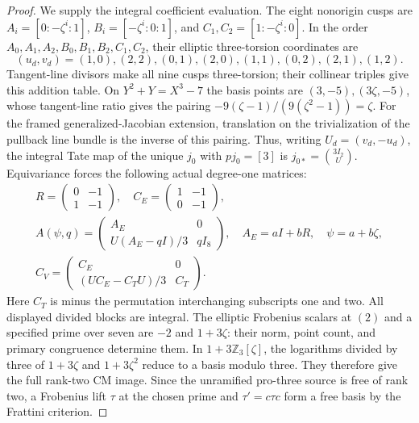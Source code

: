 \begin{proof}
We supply the integral coefficient evaluation.
The eight nonorigin cusps are
$A_i=[0:-\zeta^i:1]$, $B_i=[-\zeta^i:0:1]$,
and $C_1,C_2=[1:-\zeta^i:0]$.
In the order $A_0,A_1,A_2,B_0,B_1,B_2,C_1,C_2$,
their elliptic three-torsion coordinates are
\[
 (u_d,v_d)=(1,0),(2,2),(0,1),(2,0),
                 (1,1),(0,2),(2,1),(1,2).
 \tag{E18.8}
\]
Tangent-line divisors make all nine cusps three-torsion;
their collinear triples give this addition table.
On $Y^2+Y=X^3-7$ the basis points are
$(3,-5),(3\zeta,-5)$, whose tangent-line ratio gives
the pairing $-9(\zeta-1)/(9(\zeta^2-1))=\zeta$.
For the framed generalized-Jacobian extension,
translation on the trivialization of the pullback
line bundle is the inverse of this pairing.
Thus, writing $U_d=(v_d,-u_d)$, the integral
Tate map of the unique $j_0$ with $pj_0=[3]$ is
$j_{0*}=\binom{3I_2}{U}$. Equivariance forces
the following actual degree-one matrices:
\[
 \begin{gathered}
 R=\begin{pmatrix}0&-1\\1&-1\end{pmatrix},\quad
 C_E=\begin{pmatrix}1&-1\\0&-1\end{pmatrix},\\
 A(\psi,q)=
 \begin{pmatrix}A_E&0\\U(A_E-qI)/3&qI_8\end{pmatrix},
       \quad A_E=aI+bR,\quad\psi=a+b\zeta,\\
 C_V=\begin{pmatrix}C_E&0\\(UC_E-C_TU)/3&C_T\end{pmatrix}.
 \end{gathered}
 \tag{E18.9}
\]
Here $C_T$ is minus the permutation interchanging
subscripts one and two. All displayed divided
blocks are integral. The elliptic Frobenius
scalars at $(2)$ and a specified prime over seven
are $-2$ and $1+3\zeta$: their norm, point count,
and primary congruence determine them. In
$1+3\mathbb Z_3[\zeta]$, the logarithms divided
by three of $1+3\zeta$ and $1+3\zeta^2$ reduce
to a basis modulo three. They therefore give
the full rank-two CM image. Since the unramified
pro-three source is free of rank two, a Frobenius
lift $\tau$ at the chosen prime and
$\tau'=c\tau c$ form a free basis by the
Frattini criterion.


\end{proof}
